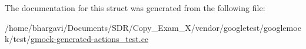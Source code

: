 The documentation for this struct was generated from the following file\+:\begin{DoxyCompactItemize}
\item 
/home/bhargavi/\+Documents/\+S\+D\+R/\+Copy\+\_\+\+Exam\+\_\+X/vendor/googletest/googlemock/test/\hyperlink{gmock-generated-actions__test_8cc}{gmock-\/generated-\/actions\+\_\+test.\+cc}\end{DoxyCompactItemize}
